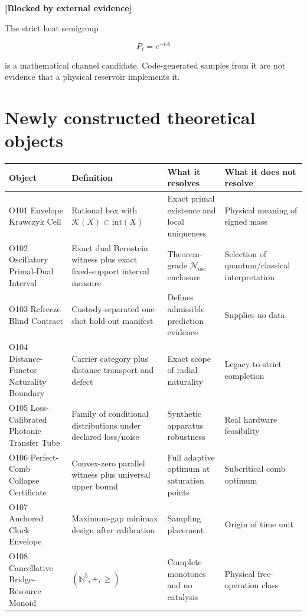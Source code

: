 \documentclass[11pt,a4paper,openany]{report}
\begin{document}
\textbf{[Blocked by external evidence]}

The strict heat semigroup

\[
P_t=e^{-tA}
\]

is a mathematical channel candidate. Code-generated samples from it are not evidence that a physical reservoir implements it.

\chapter{Newly constructed theoretical objects}

\begin{center}
\begingroup\small
\setlength{\tabcolsep}{2.5pt}
\renewcommand{\arraystretch}{1.16}
\begin{longtable}{@{}p{}p{}p{}p{}@{}}
\toprule
\textbf{Object} & \textbf{Definition} & \textbf{What it resolves} & \textbf{What it does not resolve} \\
\midrule
\endhead
O101 Envelope Krawczyk Cell & Rational box with \(\mathcal K(X)\subset\mathrm{int}(X)\) & Exact primal existence and local uniqueness & Physical meaning of signed mass \\
O102 Oscillatory Primal-Dual Interval & Exact dual Bernstein witness plus exact fixed-support interval measure & Theorem-grade \(\mathcal N_{\mathrm{osc}}\) enclosure & Selection of quantum/\allowbreak{}classical interpretation \\
O103 Refreeze Blind Contract & Custody-separated one-shot hold-out manifest & Defines admissible prediction evidence & Supplies no data \\
O104 Distance-Functor Naturality Boundary & Carrier category plus distance transport and defect & Exact scope of radial naturality & Legacy-to-strict completion \\
O105 Loss-Calibrated Photonic Transfer Tube & Family of conditional distributions under declared loss/\allowbreak{}noise & Synthetic apparatus robustness & Real hardware feasibility \\
O106 Perfect-Comb Collapse Certificate & Convex-zero parallel witness plus universal upper bound & Full adaptive optimum at saturation points & Subcritical comb optimum \\
O107 Anchored Clock Envelope & Maximum-gap minimax design after calibration & Sampling placement & Origin of time unit \\
O108 Cancellative Bridge-Resource Monoid & \((\mathbb N^5,+,\geq)\) & Complete monotones and no catalysis & Physical free-operation class \\

\end{longtable}
\end{center}
\end{document}
